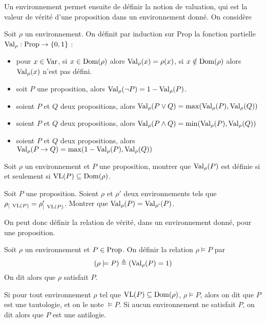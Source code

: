 Un environnement permet ensuite de définir la notion de valuation, qui est la
valeur de vérité d'une proposition dans un environnement donné. On considère

\begin{definition}[Valuation]
  Soit $\rho$ un environnement. On définit par induction sur $\mathrm{Prop}$
  la fonction partielle $\operatorname{Val}_\rho : \operatorname{Prop} \to \{0,1\}$ :
  \begin{itemize}
  \item pour $x\in \operatorname{Var}$, si $x\in \operatorname{Dom}(\rho)$ alors
    $\operatorname{Val}_\rho (x)= \rho(x)$, si $x\notin \operatorname{Dom}(\rho)$ alors
    $\operatorname{Val}_\rho (x)$ n'est pas défini.
  \item soit $P$ une proposition, alors
    $\operatorname{Val}_\rho(\lnot P) = 1 - \operatorname{Val}_\rho(P)$.
  \item soient $P$ et $Q$ deux propositions, alors
    $\operatorname{Val}_\rho(P\lor Q)=\max(\operatorname{Val}_\rho(P),\operatorname{Val}_\rho(Q))$
  \item soient $P$ et $Q$ deux propositions, alors
    $\operatorname{Val}_\rho(P\land Q)=\min(\operatorname{Val}_\rho(P),\operatorname{Val}_\rho(Q))$
  \item soient $P$ et $Q$ deux propositions, alors
    $\operatorname{Val}_\rho(P\to Q) = \max(1 - \operatorname{Val}_\rho(P),\operatorname{Val}_\rho(Q))$
  \end{itemize}
\end{definition}

\begin{exercise}
  Soit $\rho$ un environnement et $P$ une proposition, montrer que
  $\operatorname{Val}_\rho(P)$ est définie si et seulement si
  $\operatorname{VL}(P)\subseteq \operatorname{Dom}(\rho)$.
\end{exercise}

\begin{exercise}\label{exo.val.VL}
  Soit $P$ une proposition. Soient $\rho$ et $\rho'$ deux environnements tels
  que $\rho_{|\;\operatorname{VL}(P)}=\rho'_{|\;\operatorname{VL}(P)}$. Montrer que
  $\operatorname{Val}_\rho(P)=\operatorname{Val}_{\rho'}(P)$.
\end{exercise}

On peut donc définir la relation de vérité, dans un environnement donné, pour
une proposition.

\begin{definition}[Satisfaction]
  Soit $\rho$ un environnement et $P\in\operatorname{Prop}$. On définir la relation
  $\rho\models P$ par $$(\rho\models P) \triangleq (\operatorname{Val}_\rho(P) = 1)$$
  On dit alors que $\rho$ satisfait $P$.

  Si pour tout environnement $\rho$ tel que $\operatorname{VL}(P)\subseteq\operatorname{Dom}(\rho)$,
  $\rho\models P$, alors on dit que $P$ est une tautologie, et on le note
  $\models P$. Si aucun environnement ne satisfait $P$, on dit alors que $P$ est
  une antilogie.
\end{definition}

